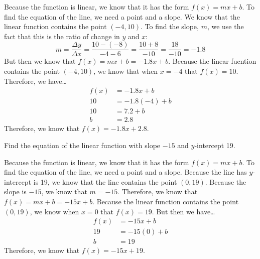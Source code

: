 \documentclass[11pt,letterpaper]{article}
\begin{document}
\sol Because the function is linear, we know that it has the form $f(x)= mx + b$. To find the equation of the line, we need a point and a slope. We know that the linear function contains the point $(-4, 10)$. To find the slope, $m$, we use the fact that this is the ratio of change in $y$ and $x$:
	\[
	m= \dfrac{\Delta y}{\Delta x}= \dfrac{10 - (-8)}{-4 - 6}= \dfrac{10 + 8}{-10}= \dfrac{18}{-10}= -1.8
	\]
But then we know that $f(x)= mx + b= -1.8x + b$. Because the linear fucntion contains the point $(-4, 10)$, we know that when $x= -4$ that $f(x)= 10$. Therefore, we have\dots
	\[
	\begin{aligned}
	f(x)&= -1.8x + b \\[0.3cm]
	10&= -1.8(-4) + b \\[0.3cm]
	10&= 7.2 + b \\[0.3cm]
	b&= 2.8
	\end{aligned}
	\]
Therefore, we know that $f(x)= -1.8x + 2.8$. 



\newpage



 Find the equation of the linear function with slope $-15$ and $y$-intercept 19. \pspace

\sol Because the function is linear, we know that it has the form $f(x)= mx + b$. To find the equation of the line, we need a point and a slope. Because the line has $y$-intercept is 19, we know that the line contains the point $(0, 19)$. Because the slope is $-15$, we know that $m= -15$. Therefore, we know that $f(x)= mx + b= -15x + b$. Because the linear function contains the point $(0, 19)$, we know when $x= 0$ that $f(x)= 19$. But then we have\dots
	\[
	\begin{aligned}
	f(x)&= -15x + b \\[0.3cm]
	19&= -15(0) + b \\[0.3cm]
	b&= 19
	\end{aligned}
	\]
Therefore, we know that $f(x)= -15x + 19$. 
\end{document}
